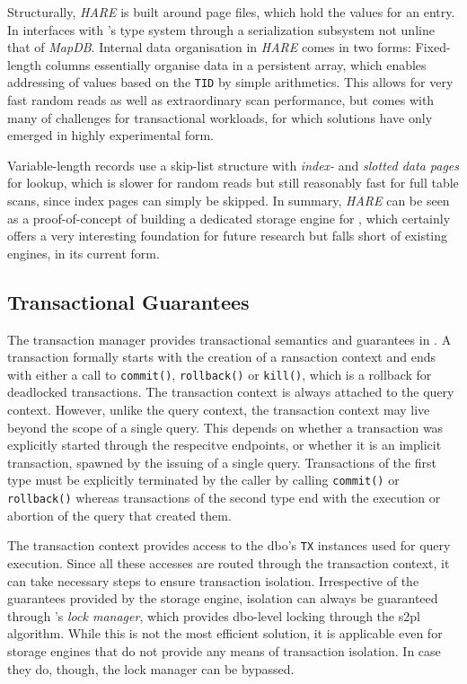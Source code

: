 Structurally, \emph{HARE} is built around page files, which hold the values for an entry. In interfaces with \cottontail{}'s type system through a serialization subsystem not unline that of \emph{MapDB}. Internal data organisation in \emph{HARE} comes in two forms: Fixed-length columns essentially organise data in a persistent array, which enables addressing of values based on the \texttt{TID} by simple arithmetics. This allows for very fast random reads as well as extraordinary scan performance, but comes with many of challenges for transactional workloads, for which solutions have only emerged in highly experimental form.

Variable-length records use a skip-list structure with \emph{index-} and \emph{slotted data pages} for lookup, which is slower for random reads but still reasonably fast for full table scans, since index pages can simply be skipped. In summary, \emph{HARE} can be seen as a proof-of-concept of building a dedicated storage engine for \cottontail, which certainly offers a very interesting foundation for future research but falls short of existing engines, in its current form.

\subsection{Transactional Guarantees}

The transaction manager provides transactional semantics and guarantees in \cottontail. A transaction formally starts with the creation of a ransaction context and ends with either a call to \texttt{commit()}, \texttt{rollback()} or  \texttt{kill()}, which is a rollback for deadlocked transactions. The transaction context is always attached to the query context. However, unlike the query context, the transaction context may live beyond the scope of a single query. This depends on whether a transaction was explicitly started through the respecitve endpoints, or whether it is an implicit transaction, spawned by the issuing of a single query. Transactions of the first type must be explicitly terminated by the caller by calling  \texttt{commit()} or \texttt{rollback()} whereas transactions of the second type end with the execution or abortion of the query that created them.

The transaction context provides access to the \acrshort{dbo}'s \texttt{TX} instances used for query execution. Since all these accesses are routed through the transaction context, it can take necessary steps to ensure transaction isolation. Irrespective of the guarantees provided by the storage engine, isolation can always be guaranteed through \cottontail{}'s \emph{lock manager}, which provides \acrshort{dbo}-level locking through the \acrshort{s2pl} algorithm. While this is not the most efficient solution, it is applicable even for storage engines that do not provide any means of transaction isolation. In case they do, though, the lock manager can be bypassed.

